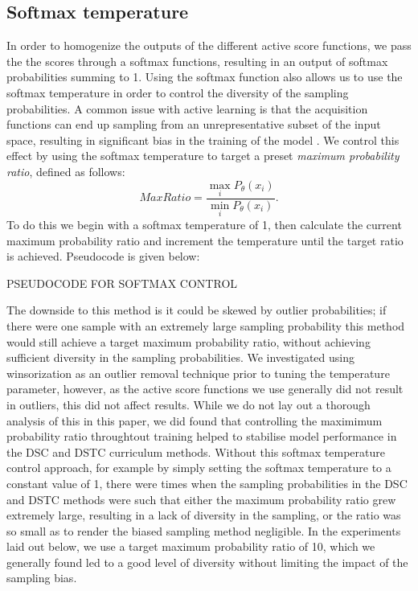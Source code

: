  \subsection{Softmax temperature}\label{Methods_SoftmaxTemperature}
In order to homogenize the outputs of the different active score functions, we pass the the scores through a softmax functions, resulting in an output of softmax probabilities summing to 1. Using the softmax function also allows us to use the softmax temperature in order to control the diversity of the sampling probabilities. A common issue with active learning is that the acquisition functions can end up sampling from an unrepresentative subset of the input space, resulting in significant bias in the training of the model \cite{settles2012active}. We control this effect by using the softmax temperature to target a preset \textit{maximum probability ratio}, defined as follows:
\begin{equation}
Max Ratio = \frac{\max_{i} P_\theta(x_i)}{\min_{i} P_\theta(x_i)}.
\end{equation}
To do this we begin with a softmax temperature of 1, then calculate the current maximum probability ratio and increment the temperature until the target ratio is achieved. Pseudocode is given below:

PSEUDOCODE FOR SOFTMAX CONTROL

The downside to this method is it could be skewed by outlier probabilities; if there were one sample with an extremely large sampling probability this method would still achieve a target maximum probability ratio, without achieving sufficient diversity in the sampling probabilities. We investigated using winsorization \cite{ghosh2012outliers} as an outlier removal technique prior to tuning the temperature parameter, however, as the active score functions we use generally did not result in outliers, this did not affect results. While we do not lay out a thorough analysis of this in this paper, we did found that controlling the maximimum probability ratio throughtout training helped to stabilise model performance in the DSC and DSTC curriculum methods. Without this softmax temperature control approach, for example by simply setting the softmax temperature to a constant value of 1, there were times when the sampling probabilities in the DSC and DSTC methods were such that either the maximum probability ratio grew extremely large, resulting in a lack of diversity in the sampling, or the ratio was so small as to render the biased sampling method negligible. In the experiments laid out below, we use a target maximum probability ratio of 10, which we generally found led to a good level of diversity without limiting the impact of the sampling bias.

